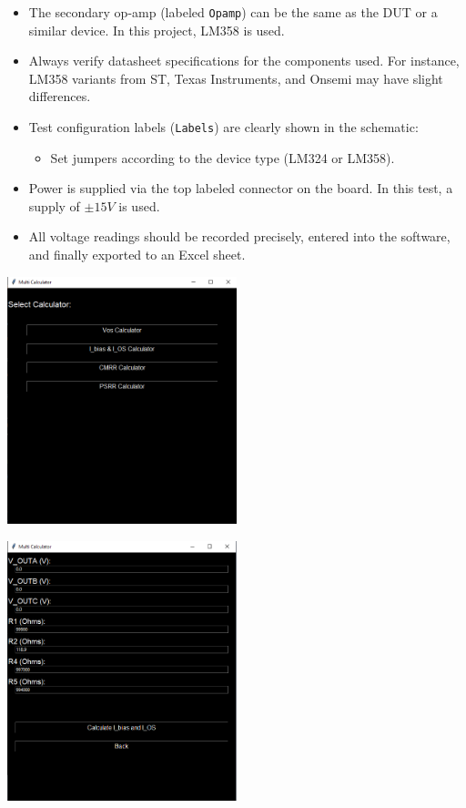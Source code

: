 \documentclass[a4paper,12pt]{article}
\begin{document}
\begin{itemize}
  \item The secondary op-amp (labeled \texttt{Opamp}) can be the same as the DUT or a similar device. In this project, LM358 is used.
  \item Always verify datasheet specifications for the components used. For instance, LM358 variants from ST, Texas Instruments, and Onsemi may have slight differences.
  \item Test configuration labels (\texttt{Labels}) are clearly shown in the schematic:
    \begin{itemize}
      \item Set jumpers according to the device type (LM324 or LM358).
    \end{itemize}
  \item Power is supplied via the top labeled connector on the board. In this test, a supply of \( \pm15V \) is used.
  \item All voltage readings should be recorded precisely, entered into the software, and finally exported to an Excel sheet.
\end{itemize}

\begin{center}
  \includegraphics[width=0.5\textwidth]{IMAGEs/ios_software.png}
\end{center}

\begin{center}
  \includegraphics[width=0.5\textwidth]{IMAGEs/ios_software_entry.png}
\end{center}
\end{document}
